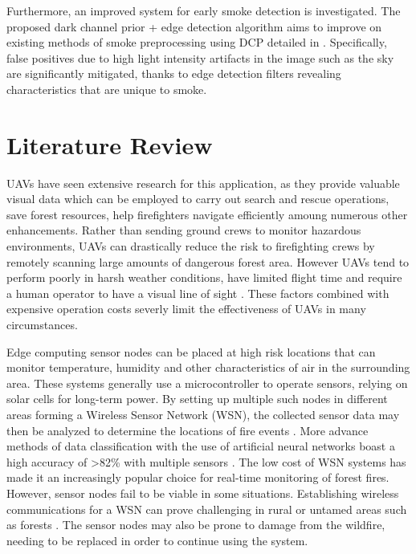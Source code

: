 \documentclass[lettersize,journal]{IEEEtran}
\begin{document}
Furthermore, an improved system for early smoke detection is
investigated. The proposed dark channel prior + edge detection algorithm
aims to improve on existing methods of smoke preprocessing using DCP
detailed in \cite{prepfire}. Specifically, false positives due to high
light intensity artifacts in the image such as the sky are significantly
mitigated, thanks to edge detection filters revealing characteristics
that are unique to smoke.



\section{Literature Review}

UAVs have seen extensive research for this application, as they provide
valuable visual data which can be employed to carry out search and
rescue operations, save forest resources, help firefighters navigate
efficiently amoung numerous other enhancements. Rather than sending
ground crews to monitor hazardous environments, UAVs can drastically
reduce the risk to firefighting crews by remotely scanning large amounts
of dangerous forest area. However UAVs tend to perform poorly in harsh
weather conditions, have limited flight time and require a human
operator to have a visual line of sight \cite{uav}. These factors
combined with expensive operation costs severly limit the effectiveness
of UAVs in many circumstances.

Edge computing sensor nodes can be placed at high risk locations that
can monitor temperature, humidity and other characteristics of air in
the surrounding area. These systems generally use a microcontroller to
operate sensors, relying on solar cells for long-term power. By setting
up multiple such nodes in different areas forming a Wireless Sensor
Network (WSN), the collected sensor data may then be analyzed to
determine the locations of fire events \cite{MohapatraAnkita2022EWDT}.
More advance methods of data classification with the use of artificial
neural networks boast a high accuracy of \textgreater82\% with multiple
sensors \cite{wsnfire}. The low cost of WSN systems has made it an
increasingly popular choice for real-time monitoring of forest fires.
However, sensor nodes fail to be viable in some situations. Establishing
wireless communications for a WSN can prove challenging in rural or
untamed areas such as forests \cite{wsnyolo}. The sensor nodes may also
be prone to damage from the wildfire, needing to be replaced in order to
continue using the system.
\end{document}
